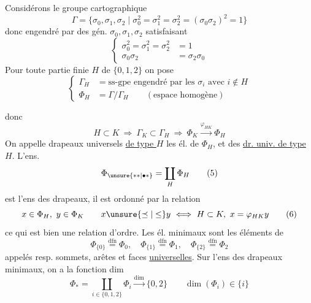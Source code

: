 Considérons le groupe cartographique
\[
 \Gamma=\{\sigma_0,\sigma_1,\sigma_2\mid\sigma_0^2=\sigma_1^2=\sigma_2^2=(\sigma_0\sigma_2)^2=1\}\tag*{(1)}
\]
donc engendré par des gén. $\sigma_0,\sigma_1,\sigma_2$ satisfaisant
\[
 \left\{\begin{aligned}
 \sigma_0^2=\sigma_1^2=\sigma_2^2&=1\\
 \sigma_0\sigma_2&=\sigma_2\sigma_0
 \end{aligned}\right.\tag*{(2)}
\]
 Pour toute partie finie   $H$ de $\{0,1,2\}$  on pose
\[
 \left\{\begin{aligned}
 \Gamma_H&=\text{ss-gpe engendré par les }\sigma_i\text{ avec }i\notin H\\
 \Phi_H&=\Gamma/\Gamma_H\qquad(\text{espace homogène})
 \end{aligned}\right.\tag*{(3)}
\]

donc
\[
 H\subset K\ \Rightarrow\ \Gamma_K\subset\Gamma_H\ \Rightarrow\ \Phi_K\xrightarrow{\varphi_{HK}}\Phi_H\tag*{(4)}
\]
On appelle drapeaux universels \uline{de type $H$} les él. de $\Phi_H$, et   des \uline{dr. univ. de type $H$}. L'ens.
\[
 \Phi_{\unsure{**|\bullet *}}=\coprod_H\Phi_H\tag*{(5)}
\]
est l'ens des drapeaux, il est ordonné par la relation
\[
 x\in\Phi_H,\ y\in\Phi_K\qquad x\unsure{\preceq|\leq}y\ \Longleftrightarrow\ H\subset K,\ x=\varphi_{HK}y\tag*{(6)}
\]
ce qui est bien une relation d'ordre. Les él. minimaux sont les éléments de
\[
 \Phi_{\{0\}}\overset{\mathrm{dfn}}=\Phi_0,\quad
 \Phi_{\{1\}}\overset{\mathrm{dfn}}=\Phi_1,\quad
 \Phi_{\{2\}}\overset{\mathrm{dfn}}=\Phi_2\tag*{(7)}
\]
appelés resp. sommets, arêtes et faces \uline{universelles}. Sur l'ens des drapeaux minimaux, on a la fonction dim
\[
 \Phi_* =\coprod_{i\in\{0,1,2\}}\Phi_i\xrightarrow{\dim}\{0,2\}\qquad\dim(\Phi_i)\in\{i\}\tag*{(8)}
\]
